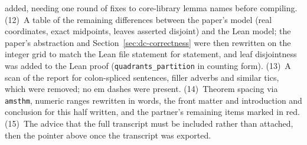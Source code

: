 added, needing one round of fixes to core-library lemma names before
compiling.
(12)~A table of the remaining differences between the paper's model
(real coordinates, exact midpoints, leaves asserted disjoint) and the Lean
model; the paper's abstraction and Section~\ref{sec:dc-correctness} were then
rewritten on the integer grid to match the Lean file statement for statement,
and leaf disjointness was added to the Lean proof
(\texttt{quadrants\_partition} in counting form).
(13)~A scan of the report for colon-spliced sentences, filler adverbs and
similar tics, which were removed; no em dashes were present.
(14)~Theorem spacing via \texttt{amsthm}, numeric ranges rewritten in words,
the front matter and introduction and conclusion for this half written, and
the partner's remaining items marked in red.
(15)~The advice that the full transcript must be included rather than
attached, then the pointer above once the transcript was exported.
